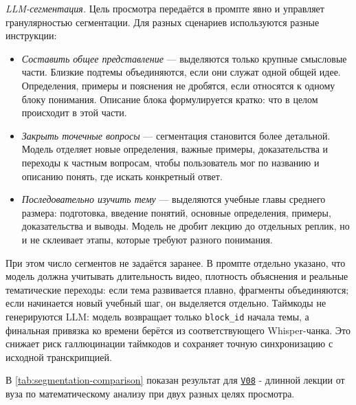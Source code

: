 \textit{LLM-сегментация.}
Цель просмотра передаётся в промпте явно и управляет гранулярностью сегментации.
Для разных сценариев используются разные инструкции:

\begin{itemize}
    \item \textit{Составить общее представление} — выделяются только крупные смысловые части.
    Близкие подтемы объединяются, если они служат одной общей идее.
    Определения, примеры и пояснения не дробятся, если относятся к одному блоку понимания.
    Описание блока формулируется кратко: что в целом происходит в этой части.

    \item \textit{Закрыть точечные вопросы} — сегментация становится более детальной.
    Модель отделяет новые определения, важные примеры, доказательства
    и переходы к частным вопросам, чтобы пользователь мог по названию
    и описанию понять, где искать конкретный ответ.

    \item \textit{Последовательно изучить тему} — выделяются учебные главы среднего размера:
    подготовка, введение понятий, основные определения, примеры, доказательства
    и выводы. Модель не дробит лекцию до отдельных реплик, но и не склеивает этапы,
    которые требуют разного понимания.
\end{itemize}

При этом число сегментов не задаётся заранее.
В промпте отдельно указано, что модель должна учитывать длительность видео,
плотность объяснения и реальные тематические переходы:
если тема развивается плавно, фрагменты объединяются;
если начинается новый учебный шаг, он выделяется отдельно.
Таймкоды не генерируются LLM: модель возвращает только \texttt{block\_id}
начала темы, а финальная привязка ко времени берётся из соответствующего
Whisper-чанка. Это снижает риск галлюцинации таймкодов и сохраняет точную
синхронизацию с исходной транскрипцией.

В \cref{tab:segmentation-comparison} показан результат для \hyperlink{vid:v08}{\texttt{V08}} - длинной лекции от вуза по математическому анализу
при двух разных целях просмотра.

